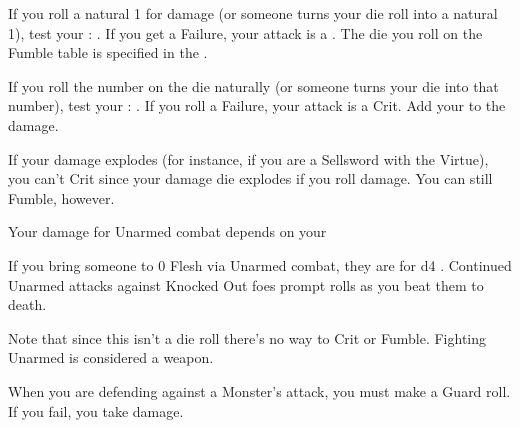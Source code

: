 {  

  If you roll a natural 1 for damage (or someone turns your die roll into a natural 1), test your  \RS : \FOC.  If you get a Failure, your attack is a .  The die you roll on the Fumble table is specified in the .

  If you roll the \MAX number on the die naturally (or someone turns your die into that \MAX number), test your \RS : \FOC.  If you  roll a Failure, your attack is a Crit.  Add your \LVL to the damage.

\newpage


  If your damage explodes (for instance, if you are a Sellsword with the  Virtue), you can't Crit since your damage die explodes if you roll \MAX damage.  You can still Fumble, however.



  Your damage for Unarmed combat depends on your \VIG


  If you bring someone to 0 Flesh via Unarmed combat, they are  for d4 .  Continued Unarmed attacks against Knocked Out foes prompt \DEATH rolls as you beat them to death.

  Note that since this isn't a die roll there's no way to Crit or Fumble.  Fighting Unarmed is considered a  weapon.





  When you are defending against a Monster's attack, you must make a Guard roll.  If you fail, you take damage.

}
